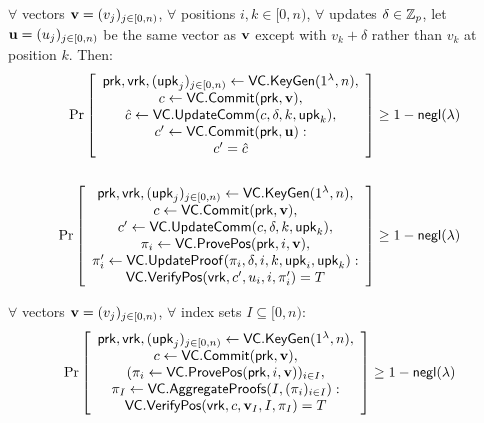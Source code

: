 \begin{definition}
    $\forall$ vectors $\bm{\mathrm{v}}=(v_j)_{j\in [0,n)}$, $\forall$ positions $i,k\in[0,n)$, $\forall$ updates $\delta\in \mathbb{Z}_p$, let $\bm{\mathrm{u}}=(u_j)_{j\in[0,n)}$ be the same vector as $\bm{\mathrm{v}}$ except with $v_k+\delta$ rather than $v_k$ at position $k$.
    Then:
    \begin{align*}
    \Pr \left[ \begin{array}{c}
    \mathsf{prk},\mathsf{vrk},(\mathsf{upk}_j)_{j\in[0,n)} \leftarrow \mathsf{VC}.\mathsf{KeyGen}(1^\lambda, n), \\
    c \leftarrow \mathsf{VC}.\mathsf{Commit}(\mathsf{prk}, \bm{\mathrm{v}}),\\
    \hat{c}\leftarrow \mathsf{VC}.\mathsf{UpdateComm}(c, \delta, k,\mathsf{upk}_k),\\
    c' \leftarrow \mathsf{VC}.\mathsf{Commit}(\mathsf{prk}, \bm{\mathrm{u}}):\\
    c' = \hat{c}
    \end{array} \right] \ge 1 - \mathsf{negl}(\lambda)\\
    \\
    \Pr \left[ \begin{array}{c}
    \mathsf{prk},\mathsf{vrk},(\mathsf{upk}_j)_{j\in[0,n)} \leftarrow \mathsf{VC}.\mathsf{KeyGen}(1^\lambda, n), \\
    c \leftarrow \mathsf{VC}.\mathsf{Commit}(\mathsf{prk}, \bm{\mathrm{v}}),\\
    c' \leftarrow \mathsf{VC}.\mathsf{UpdateComm}(c, \delta, k,\mathsf{upk}_k),\\
    \pi_i \leftarrow \mathsf{VC}.\mathsf{ProvePos}(\mathsf{prk}, i, \bm{\mathrm{v}}),\\
    \pi'_i \leftarrow \mathsf{VC}.\mathsf{UpdateProof}(\pi_i, \delta, i, k,\mathsf{upk}_i, \mathsf{upk}_k):\\
    \mathsf{VC}.\mathsf{VerifyPos}(\mathsf{vrk}, c', u_i, i, \pi'_i) = T
    \end{array} \right] \ge 1 - \mathsf{negl}(\lambda)
    \end{align*}
\end{definition}

\begin{definition}
    $\forall$ vectors $\bm{\mathrm{v}}=(v_j)_{j\in [0,n)}$, $\forall$ index sets $I\subseteq[0,n)$:
    \begin{align*}
    \Pr \left[ \begin{array}{c}
    \mathsf{prk},\mathsf{vrk},(\mathsf{upk}_j)_{j\in[0,n)}\leftarrow \mathsf{VC}.\mathsf{KeyGen}(1^\lambda, n), \\
    c \leftarrow \mathsf{VC}.\mathsf{Commit}(\mathsf{prk},\bm{\mathrm{v}}),\\
    (\pi_i \leftarrow \mathsf{VC}.\mathsf{ProvePos}(\mathsf{prk}, i, \bm{\mathrm{v}}))_{i\in I},\\
    \pi_I \leftarrow \mathsf{VC}.\mathsf{AggregateProofs}(I, (\pi_i)_{i\in I}):\\
    \mathsf{VC}.\mathsf{VerifyPos}(\mathsf{vrk}, c, \bm{\mathrm{v}}_I, I, \pi_I) = T
    \end{array} \right] \ge 1 - \mathsf{negl}(\lambda)
    \end{align*}
\end{definition}

